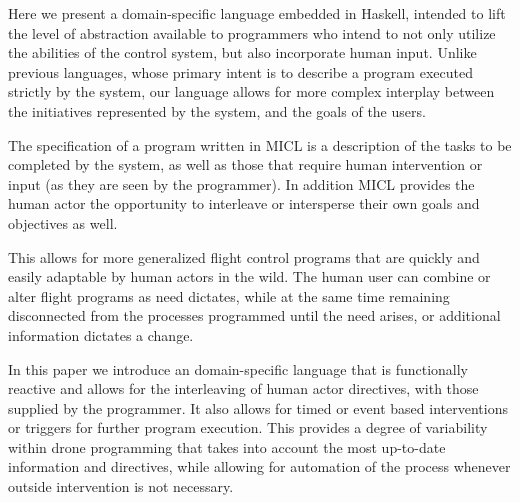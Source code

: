 \documentclass{sig-alternate-05-2015}
\begin{document}
Here we present a domain-specific language embedded in Haskell, intended to
lift the level of abstraction available to programmers who intend to not only
utilize the abilities of the control system, but also incorporate human
input. Unlike previous languages, whose primary intent is to describe a
program executed strictly by the system, our language allows for more complex
interplay between the initiatives represented by the system, and the goals
of the users.

The specification of a program written in MICL is a description of the
tasks to be completed by the system, as well as those that require human
intervention or input (as they are seen by the programmer). In addition
MICL provides the human actor the opportunity to interleave or
intersperse their own goals and objectives as well.



This allows for more generalized flight control programs that are quickly and
easily adaptable by human actors in the wild. The human user can combine or
alter flight programs as need dictates, while at the same time remaining
disconnected from the processes programmed until the need arises, or
additional information dictates a change.

In this paper we introduce an domain-specific language that is functionally
reactive and allows for the interleaving of human actor directives, with those
supplied by the programmer. It also allows for timed or event based
interventions or triggers for further program execution. This provides a
degree of variability within drone programming that takes into account the
most up-to-date information and directives, while allowing for automation of
the process whenever outside intervention is not necessary.
\end{document}

